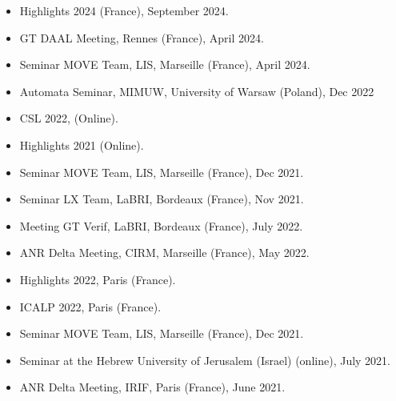\documentclass[11pt,a4paper,roman]{moderncv}        %
\begin{document}
	{\begin{itemize}
			\item Highlights 2024 (France), September 2024.
			\item GT DAAL Meeting, Rennes (France), April 2024.
			\item Seminar MOVE Team, LIS, Marseille (France), April 2024.
		\end{itemize}
	}
	
	
	{\begin{itemize}
			\item Automata Seminar, MIMUW, University of Warsaw (Poland), Dec 2022
			\item CSL 2022, (Online).
			\item Highlights 2021 (Online).
			\item Seminar MOVE Team, LIS, Marseille (France), Dec 2021.
			\item Seminar LX Team, LaBRI, Bordeaux (France), Nov 2021.	\end{itemize}
	}
	
	{\begin{itemize}
			\item Meeting GT Verif, LaBRI, Bordeaux (France), July 2022.
			\item ANR Delta Meeting, CIRM, Marseille (France), May 2022.
		\end{itemize}
	}
	
	{\begin{itemize}
			\item Highlights 2022, Paris (France).
			\item ICALP 2022, Paris (France).
			\item Seminar MOVE Team, LIS, Marseille (France), Dec 2021.
		\end{itemize}
	}
	
	{\begin{itemize}
			\item Seminar at the Hebrew University of Jerusalem (Israel) (online), July 2021.
			\item ANR Delta Meeting, IRIF, Paris (France), June 2021.
		\end{itemize}
	}
	
\end{document}

